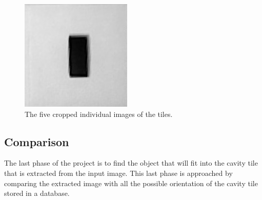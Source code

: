 \documentclass{article}
\begin{document}
\begin{figure}[h!]
\begin{minipage}{\textwidth}
\hspace{0.1cm}
\includegraphics[scale=0.3]{images/tile4.jpg}
\caption{The five cropped individual images of the tiles.}
\label{fig:individ}
\end{minipage}
\end{figure}

\subsection{Comparison}
The last phase of the project is to find the object that will fit into the cavity tile that is extracted from the input image. This last phase is approached by comparing the extracted image with all the possible orientation of the cavity tile stored in a database.  
\end{document}
